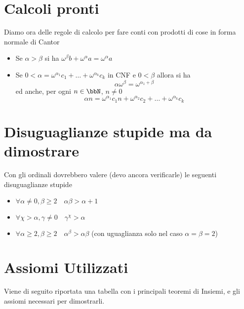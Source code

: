\documentclass[a4paper,NoNotes,GeneralMath]{stdmdoc}
\begin{document}
	\section*{Calcoli pronti}
	Diamo ora delle regole di calcolo per fare conti con prodotti di cose in forma normale di Cantor
	\begin{itemize}
		\item Se $\alpha > \beta$ si ha $\omega^\beta b + \omega^\alpha a = \omega^\alpha a$
		\item Se $0 < \alpha = \omega^{\alpha_1} c_1 + \ldots + \omega^{\alpha_k} c_k$ in CNF e $0 < \beta$ allora si ha
			$$ \alpha \omega^\beta = \omega^{\alpha_1 + \beta} $$ ed anche, per ogni $n \in \bbN$, $n \neq 0$
			$$ \alpha n = \omega^{\alpha_1} c_1 n + \omega^{\alpha_2} c_2 + \ldots + \omega^{\alpha_k} c_k $$
	\end{itemize}
	
	\section*{Disuguaglianze stupide ma da dimostrare}
	Con gli ordinali dovrebbero valere (devo ancora verificarle) le seguenti disuguaglianze stupide
	\begin{itemize}
		\item $\forall \alpha \neq 0, \beta \ge 2 \quad \alpha \beta > \alpha + 1$
		\item $\forall \chi > \alpha, \gamma \neq 0 \quad \gamma^\chi > \alpha$
		\item $\forall \alpha \ge 2, \beta \ge 2 \quad \alpha^\beta > \alpha \beta$ (con uguaglianza solo nel caso $\alpha = \beta = 2$)
	\end{itemize}
	
	\section*{Assiomi Utilizzati}
	Viene di seguito riportata una tabella con i principali teoremi di Insiemi, e gli assiomi necessari per dimostrarli.
	
	
\end{document}
